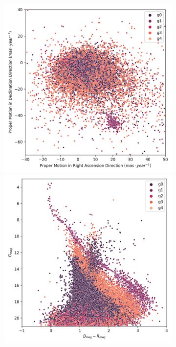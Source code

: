 \documentclass[11pt,a4paper,english,twocolumn]{article}
\begin{document}
\begin{figure}[!htbp]
  \centering
  \begin{subfigure}[b]{0.3\textwidth}
    \centering
      \includegraphics[width=\textwidth]{../figures/melotte_22/kmeans_pm_melotte_22.png}
      \includegraphics[width=\textwidth]{../figures/melotte_22/kmeans_hr_diagram_melotte_22.png}

\end{subfigure}
\end{figure}
\end{document}
